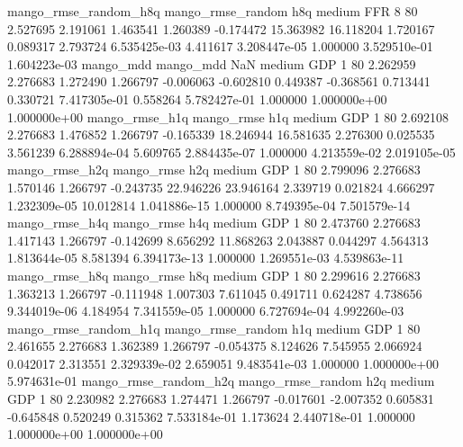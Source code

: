 mango_rmse_random_h8q mango_rmse_random                  h8q     medium      FFR                 8 80  2.527695       2.191061 1.463541       1.260389   -0.174472     15.363982     16.118204     1.720167       0.089317  2.793724 6.535425e-03     4.411617   3.208447e-05            1.000000    3.529510e-01        1.604223e-03
            mango_mdd         mango_mdd                  NaN     medium      GDP                 1 80  2.262959       2.276683 1.272490       1.266797   -0.006063     -0.602810      0.449387    -0.368561       0.713441  0.330721 7.417305e-01     0.558264   5.782427e-01            1.000000    1.000000e+00        1.000000e+00
       mango_rmse_h1q        mango_rmse                  h1q     medium      GDP                 1 80  2.692108       2.276683 1.476852       1.266797   -0.165339     18.246944     16.581635     2.276300       0.025535  3.561239 6.288894e-04     5.609765   2.884435e-07            1.000000    4.213559e-02        2.019105e-05
       mango_rmse_h2q        mango_rmse                  h2q     medium      GDP                 1 80  2.799096       2.276683 1.570146       1.266797   -0.243735     22.946226     23.946164     2.339719       0.021824  4.666297 1.232309e-05    10.012814   1.041886e-15            1.000000    8.749395e-04        7.501579e-14
       mango_rmse_h4q        mango_rmse                  h4q     medium      GDP                 1 80  2.473760       2.276683 1.417143       1.266797   -0.142699      8.656292     11.868263     2.043887       0.044297  4.564313 1.813644e-05     8.581394   6.394173e-13            1.000000    1.269551e-03        4.539863e-11
       mango_rmse_h8q        mango_rmse                  h8q     medium      GDP                 1 80  2.299616       2.276683 1.363213       1.266797   -0.111948      1.007303      7.611045     0.491711       0.624287  4.738656 9.344019e-06     4.184954   7.341559e-05            1.000000    6.727694e-04        4.992260e-03
mango_rmse_random_h1q mango_rmse_random                  h1q     medium      GDP                 1 80  2.461655       2.276683 1.362389       1.266797   -0.054375      8.124626      7.545955     2.066924       0.042017  2.313551 2.329339e-02     2.659051   9.483541e-03            1.000000    1.000000e+00        5.974631e-01
mango_rmse_random_h2q mango_rmse_random                  h2q     medium      GDP                 1 80  2.230982       2.276683 1.274471       1.266797   -0.017601     -2.007352      0.605831    -0.645848       0.520249  0.315362 7.533184e-01     1.173624   2.440718e-01            1.000000    1.000000e+00        1.000000e+00
